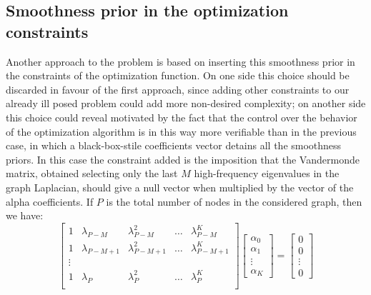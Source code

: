\subsection{Smoothness prior in the optimization constraints}
Another approach to the problem is based on inserting this smoothness prior in the constraints of the optimization function. On one side this choice should be discarded in favour of the first approach, since adding other constraints to our already ill posed problem could add more non-desired complexity; on another side this choice could reveal motivated by the fact that the control over the behavior of the optimization algorithm is in this way more verifiable than in the previous case, in which a black-box-stile coefficients vector detains all the smoothness priors. In this case the constraint added is the imposition that the Vandermonde matrix, obtained selecting only the last $M$ high-frequency eigenvalues in the graph Laplacian, should give a null vector when multiplied by the vector of the alpha coefficients. If $P$ is the total number of nodes in the considered graph, then we have:
\begin{equation}
  \begin{bmatrix}
    1 & \lambda_{P-M} & \lambda_{P-M}^2 & \dots & \lambda_{P-M}^{K} \\
    1 & \lambda_{P-M+1} & \lambda_{P-M+1}^2 & \dots & \lambda_{P-M+1}^{K} \\
    \vdots & & \\
    1 & \lambda_P & \lambda_P^2 & \dots & \lambda_P^K \\
  \end{bmatrix}
  \begin{bmatrix}
    \alpha_0 \\
    \alpha_1 \\
    \vdots \\
    \alpha_K
  \end{bmatrix}
  =
  \begin{bmatrix}
    0\\
    0\\
    \vdots\\
    0
  \end{bmatrix}
\end{equation}
